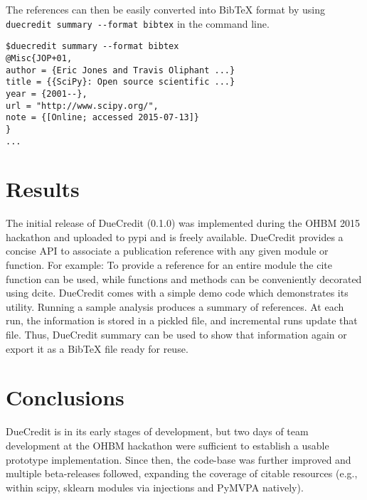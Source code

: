 \documentclass[twocolumn]{bmcart}%
\begin{document}
The references can then be easily converted into BibTeX format by using
\texttt{duecredit\ summary\ -\/-format\ bibtex} in the command line.

\begin{verbatim}
$duecredit summary --format bibtex
@Misc{JOP+01,
author = {Eric Jones and Travis Oliphant ...}
title = {{SciPy}: Open source scientific ...}
year = {2001--},
url = "http://www.scipy.org/",
note = {[Online; accessed 2015-07-13]}
}
...
\end{verbatim}

\section{Results}\label{results}

The initial release of DueCredit (0.1.0) was implemented during the OHBM
2015 hackathon and uploaded to pypi and is freely available. DueCredit
provides a concise API to associate a publication reference with any
given module or function. For example: To provide a reference for an
entire module the cite function can be used, while functions and methods
can be conveniently decorated using dcite. DueCredit comes with a simple
demo code which demonstrates its utility. Running a sample analysis
produces a summary of references. At each run, the information is stored
in a pickled file, and incremental runs update that file. Thus,
DueCredit summary can be used to show that information again or export
it as a BibTeX file ready for reuse.

\section{Conclusions}\label{conclusions}

DueCredit is in its early stages of development, but two days of team
development at the OHBM hackathon were sufficient to establish a usable
prototype implementation. Since then, the code-base was further improved
and multiple beta-releases followed, expanding the coverage of citable
resources (e.g., within scipy, sklearn modules via injections and PyMVPA
natively).

\end{document}
